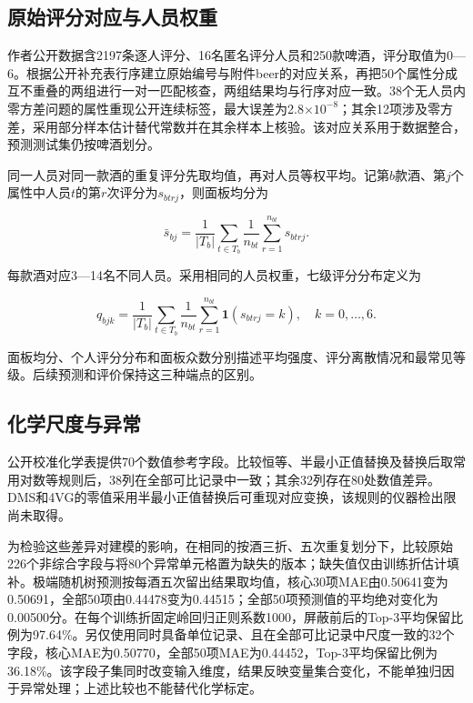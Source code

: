 \documentclass{mathorcup-journal}
\begin{document}
\subsection{原始评分对应与人员权重}

作者公开数据含2197条逐人评分、16名匿名评分人员和250款啤酒，评分取值为0—6。根据公开补充表行序建立原始编号与附件beer的对应关系，再把50个属性分成互不重叠的两组进行一对一匹配核查，两组结果均与行序对应一致。38个无人员内零方差问题的属性重现公开连续标签，最大误差为2.8×$10^{-8}$；其余12项涉及零方差，采用部分样本估计替代常数并在其余样本上核验。该对应关系用于数据整合，预测测试集仍按啤酒划分。


同一人员对同一款酒的重复评分先取均值，再对人员等权平均。记第$b$款酒、第$j$个属性中人员$t$的第$r$次评分为$s_{btrj}$，则面板均分为


\begin{equation}
\bar s_{bj}=\frac{1}{|T_b|}\sum_{t\in T_b}\frac{1}{n_{bt}}\sum_{r=1}^{n_{bt}}s_{btrj}.
\end{equation}

每款酒对应3—14名不同人员。采用相同的人员权重，七级评分分布定义为


\begin{equation}
q_{bjk}=\frac{1}{|T_b|}\sum_{t\in T_b}\frac{1}{n_{bt}}\sum_{r=1}^{n_{bt}}\mathbf1(s_{btrj}=k),\quad k=0,\ldots,6.
\end{equation}

面板均分、个人评分分布和面板众数分别描述平均强度、评分离散情况和最常见等级。后续预测和评价保持这三种端点的区别。


\subsection{化学尺度与异常}

公开校准化学表提供70个数值参考字段。比较恒等、半最小正值替换及替换后取常用对数等规则后，38列在全部可比记录中一致；其余32列存在80处数值差异。DMS和4VG的零值采用半最小正值替换后可重现对应变换，该规则的仪器检出限尚未取得。

为检验这些差异对建模的影响，在相同的按酒三折、五次重复划分下，比较原始226个非综合字段与将80个异常单元格置为缺失的版本；缺失值仅由训练折估计填补。极端随机树预测按每酒五次留出结果取均值，核心30项MAE由0.50641变为0.50691，全部50项由0.44478变为0.44515；全部50项预测值的平均绝对变化为0.00500分。在每个训练折固定岭回归正则系数1000，屏蔽前后的Top-3平均保留比例为97.64\%。另仅使用同时具备单位记录、且在全部可比记录中尺度一致的32个字段，核心MAE为0.50770，全部50项MAE为0.44452，Top-3平均保留比例为36.18\%。该字段子集同时改变输入维度，结果反映变量集合变化，不能单独归因于异常处理；上述比较也不能替代化学标定。
\end{document}
